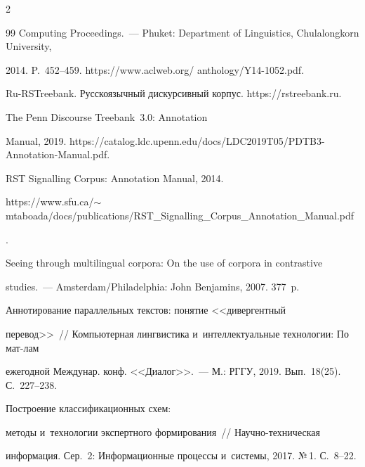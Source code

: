 \begin{multicols}{2}
{{\begin{thebibliography}{99}
Computing Proceedings.~--- Phuket: Department of Linguistics, Chulalongkorn University, 


2014. P.~452--459. {\sf https://www.aclweb.org/ anthology/Y14-1052.pdf}.




Ru-RSTreebank. Русскоязычный дискурсивный корпус. {\sf https://rstreebank.ru}.




 The Penn Discourse Treebank~3.0: Annotation 


Manual, 2019. {\sf https://\linebreak catalog.ldc.upenn.edu/docs/LDC2019T05/PDTB3-Annotation-Manual.pdf}.




 RST Signalling Corpus: Annotation Manual, 2014. {\sf 


https://www.sfu.ca/$\sim$mtaboada/docs/\linebreak publications/RST\_Signalling\_Corpus\_Annotation\_\linebreak Manual.pdf}.




 Seeing through multilingual corpora: On the use of corpora in contrastive 


studies.~--- Amsterdam/Philadelphia: John Benjamins, 2007. 377~p.




 Аннотирование параллельных текстов: понятие <<дивергентный 


перевод>>~// Компьютерная лингвистика и~интеллектуальные технологии: По мат-лам 


ежегодной Междунар. конф. <<Диалог>>.~--- М.: РГГУ, 2019. Вып.~18(25). С.~227--238.




 По\-стро\-ение классификационных схем: 


методы и~технологии экспертного формирования~// На\-уч\-но-тех\-ни\-че\-ская 


информация. Сер.~2: Информационные процессы и~сис\-те\-мы, 2017. №\,1. С.~8--22.


 \end{thebibliography}





}


}





\end{multicols}





